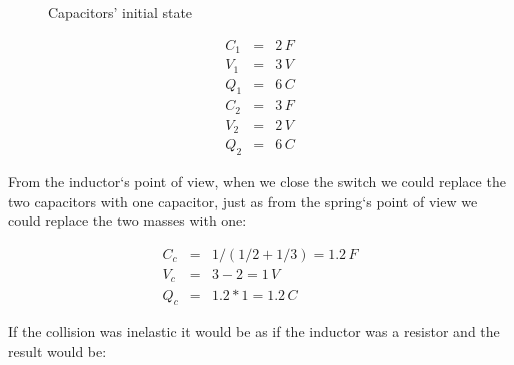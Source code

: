 \documentclass[]{../common/elementary-physics}
\begin{document}
\begin{figure}[ht] \centering
	\qquad
	\caption{Capacitors' initial state}
\end{figure}

\begin{eqnarray}
C_1 &=& 2 \, F \\
V_1 &=& 3 \, V \\
Q_1 &=& 6 \, C \\
C_2 &=& 3 \, F \\
V_2 &=& 2 \, V \\
Q_2 &=& 6 \, C
\end{eqnarray}

From the inductor`s point of view, when we close the switch we could replace the two capacitors with one capacitor, just as from the spring`s point of view we could replace the two masses with one:

\begin{eqnarray}
C_c &=& 1/(1/2 + 1/3) = 1.2 \, F \\
V_c &=& 3 - 2 = 1 \, V \\
Q_c &=& 1.2 * 1 = 1.2 \, C
\end{eqnarray}

If the collision was inelastic it would be as if the inductor was a resistor and the result would be:
\end{document}

